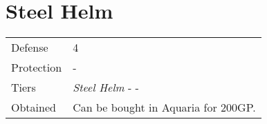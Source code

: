 \section{Steel Helm}
\label{armor:steel_helm}


\noindent\begin{tabularx}{\textwidth}[l]{lX}
	Defense
	& 4
\\ %
	Protection
	& -
\\ %
	Tiers
	& \textit{Steel Helm} - \nameref{armor:moon_helm} - \nameref{armor:apollo_helm}
\\ %
	Obtained
	& Can be bought in Aquaria for 200GP.
\end{tabularx}
